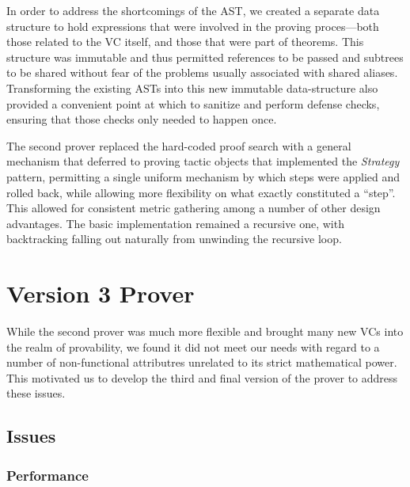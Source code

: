 In order to address the shortcomings of the AST, we created a separate data structure to hold expressions that were involved in the proving proces---both those related to the VC itself, and those that were part of theorems.  This structure was immutable and thus permitted references to be passed and subtrees to be shared without fear of the problems usually associated with shared aliases.  Transforming the existing ASTs into this new immutable data-structure also provided a convenient point at which to sanitize and perform defense checks, ensuring that those checks only needed to happen once.

The second prover replaced the hard-coded proof search with a general mechanism that deferred to proving tactic objects that implemented the \emph{Strategy} pattern, permitting a single uniform mechanism by which steps were applied and rolled back, while allowing more flexibility on what exactly constituted a ``step''.  This allowed for consistent metric gathering among a number of other design advantages.  The basic implementation remained a recursive one, with backtracking falling out naturally from unwinding the recursive loop.

\section{Version 3 Prover}

While the second prover was much more flexible and brought many new VCs into the realm of provability, we found it did not meet our needs with regard to a number of non-functional attributres unrelated to its strict mathematical power.  This motivated us to develop the third and final version of the prover to address these issues.

	\subsection{Issues}

		\subsubsection{Performance}

